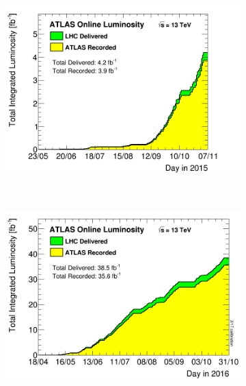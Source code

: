 \begin{figure}[!htbp]
    \centering
    \begin{subfigure}[b]{0.45\textwidth}
      \includegraphics[width=\textwidth]{fig/sumLumiByDay.png}
      \caption{}
      \label{fig:data_taking_2015}
    \end{subfigure}%
    ~%
    \begin{subfigure}[b]{0.45\textwidth}
      \includegraphics[width=\textwidth]{fig/sumLumiByDay_2016.png}
      \caption{}
      \label{fig:data_taking_2016}
    \end{subfigure} \\
    \begin{subfigure}[b]{0.45\textwidth}
      \centering

\end{subfigure}
\end{figure}
